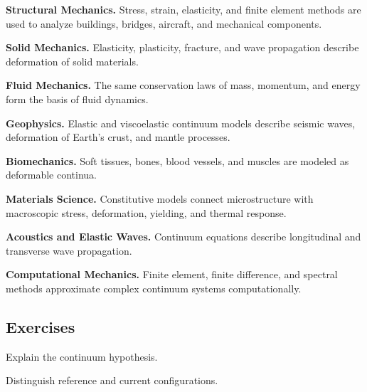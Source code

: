 \begin{applicationbox}

\textbf{Structural Mechanics.}
Stress, strain, elasticity, and finite element methods are used to analyze
buildings, bridges, aircraft, and mechanical components.

\medskip

\textbf{Solid Mechanics.}
Elasticity, plasticity, fracture, and wave propagation describe deformation
of solid materials.

\medskip

\textbf{Fluid Mechanics.}
The same conservation laws of mass, momentum, and energy form the basis of
fluid dynamics.

\medskip

\textbf{Geophysics.}
Elastic and viscoelastic continuum models describe seismic waves,
deformation of Earth's crust, and mantle processes.

\medskip

\textbf{Biomechanics.}
Soft tissues, bones, blood vessels, and muscles are modeled as deformable
continua.

\medskip

\textbf{Materials Science.}
Constitutive models connect microstructure with macroscopic stress,
deformation, yielding, and thermal response.

\medskip

\textbf{Acoustics and Elastic Waves.}
Continuum equations describe longitudinal and transverse wave propagation.

\medskip

\textbf{Computational Mechanics.}
Finite element, finite difference, and spectral methods approximate complex
continuum systems computationally.

\end{applicationbox}

\subsection{Exercises}
\label{subsec:continuum-mechanics-exercises}

\begin{exercise}[1]
Explain the continuum hypothesis.
\end{exercise}

\begin{exercise}[1]
Distinguish reference and current configurations.
\end{exercise}

